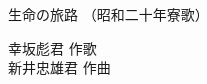 \documentclass[10pt,b5j]{tarticle} %
\begin{document}
\begin{minipage}[c]{0.7\hsize} %
    \begin{center}
        {\LARGE
            生命の旅路 %
        }
        {\small 
            （昭和二十年寮歌） %
        }
    \end{center}
\end{minipage}
\begin{minipage}[c]{0.3\hsize} %
    \begin{flushright} %
        幸坂彪君 作歌\\新井忠雄君 作曲 %
    \end{flushright}
\end{minipage}
\end{document}
